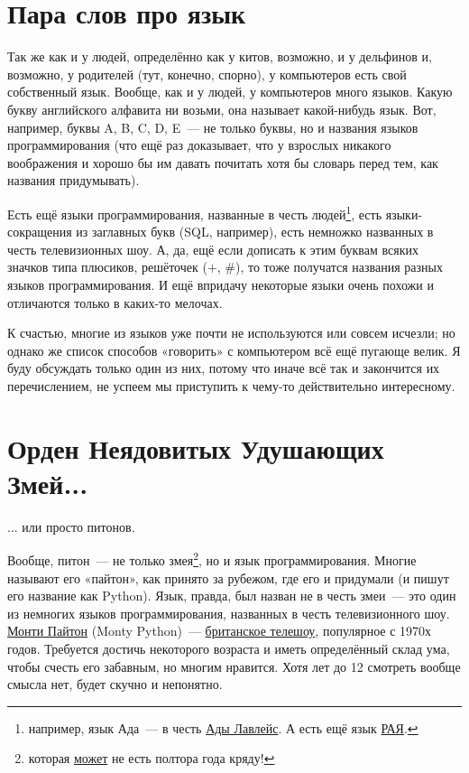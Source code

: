 \section{Пара слов про язык}

Так же как и у людей, определённо как у китов, возможно, и у дельфинов и, возможно, у родителей (тут, конечно, спорно), у компьютеров есть свой собственный язык. Вообще, как и у людей, у компьютеров много языков. Какую букву английского алфавита ни возьми, она называет какой-нибудь язык. Вот, например, буквы A, B, C, D, E — не только буквы, но и названия языков программирования (что ещё раз доказывает, что у взрослых никакого воображения и хорошо бы им давать почитать хотя бы словарь перед тем, как названия придумывать).

Есть ещё языки программирования, названные в честь людей\footnote{например, язык Ада — в честь \href{https://ru.wikipedia.org/wiki/\%D0\%9B\%D0\%B0\%D0\%B2\%D0\%BB\%D0\%B5\%D0\%B9\%D1\%81,_\%D0\%90\%D0\%B4\%D0\%B0}{Ады Лавлейс}. А есть ещё язык \href{https://ru.wikipedia.org/wiki/\%D0\%A3\%D1\%87\%D0\%B5\%D0\%B1\%D0\%BD\%D1\%8B\%D0\%B9_\%D0\%B0\%D0\%BB\%D0\%B3\%D0\%BE\%D1\%80\%D0\%B8\%D1\%82\%D0\%BC\%D0\%B8\%D1\%87\%D0\%B5\%D1\%81\%D0\%BA\%D0\%B8\%D0\%B9_\%D1\%8F\%D0\%B7\%D1\%8B\%D0\%BA}{РАЯ}.},
есть языки-сокращения из заглавных букв (SQL, например),  есть немножко названных в честь телевизионных шоу. А, да, ещё если дописать к этим буквам всяких значков типа плюсиков, решёточек (+, \#), то тоже получатся названия разных языков программирования. И ещё впридачу некоторые языки очень похожи и отличаются только в каких-то мелочах.


К счастью, многие из языков уже почти не используются или совсем исчезли; но однако же список способов «говорить» с компьютером всё ещё пугающе велик. Я буду обсуждать только один из них, потому что иначе всё так и закончится их перечислением, не успеем мы приступить к чему-то действительно интересному.

\section{Орден Неядовитых Удушающих Змей...}

... или просто питонов.

Вообще, питон — не только змея\footnote{которая \href{https://ru.wikipedia.org/w/index.php?title=\%D0\%9F\%D0\%B8\%D1\%82\%D0\%BE\%D0\%BD\%D1\%8B&oldid=70828612\#.D0.9F.D0.B8.D1.82.D0.B0.D0.BD.D0.B8.D0.B5}{может} не есть полтора года кряду!}, но и язык программирования. Многие называют его «пайтон», как принято за рубежом, где его и придумали (и пишут его название как Python). Язык, правда, был назван не в честь змеи — это один из немногих языков программирования, названных в честь телевизионного шоу. \href{http://www.youtube.com/watch?v=YO2xZbac7lw&list=PL89E217812DCA2BDA}{Монти Пайтон} (Monty Python) — \href{http://www.montypython.com/}{британское телешоу}, популярное с 1970х годов. Требуется достичь некоторого возраста и иметь определённый склад ума, чтобы счесть его забавным, но многим нравится. Хотя лет до 12 смотреть вообще смысла нет, будет скучно и непонятно.

